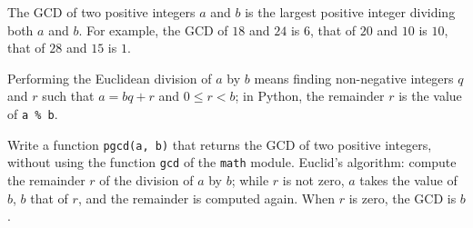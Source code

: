 The GCD of two positive integers $a$ and $b$ is the largest positive integer dividing both $a$ and $b$. For example, the GCD of $18$ and $24$ is $6$, that of $20$ and $10$ is $10$, that of $28$ and $15$ is $1$.

Performing the Euclidean division of $a$ by $b$ means finding non-negative integers $q$ and $r$ such that $a = bq + r$ and $0 \le r < b$; in Python, the remainder $r$ is the value of \texttt{a \% b}.

Write a function \texttt{pgcd(a, b)} that returns the GCD of two positive integers, without using the function \texttt{gcd} of the \texttt{math} module. Euclid's algorithm: compute the remainder $r$ of the division of $a$ by $b$; while $r$ is not zero, $a$ takes the value of $b$, $b$ that of $r$, and the remainder is computed again. When $r$ is zero, the GCD is $b$.
